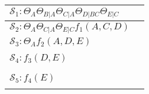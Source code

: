 \documentclass[a4paper,10pt]{article}
\theoremstyle{plain}
\begin{document}
\begin{table}[h]
  \begin{center}
    \begin{tabular}{l | c}
      $\mathcal{S}_1: \Theta_A \Theta_{B|A} \Theta_{C|A} \Theta_{D|BC} \Theta_{E|C}$ &  \\
      \hline
      $\mathcal{S}_2: \Theta_A \Theta_{C|A} \Theta_{E|C} f_1(A, C, D)$ &  \\
      \hline
      $\mathcal{S}_3: \Theta_A f_2(A, D, E)$ &  \\
      \hline
      & \\
      $\mathcal{S}_4: f_3(D, E)$ &  \\
      & \\
      \hline
      & \\
      $\mathcal{S}_5: f_4(E)$ &  \\
      & \\
    \end{tabular}
  \end{center}
\end{table}


\newpage

\printbibliography
\end{document}
